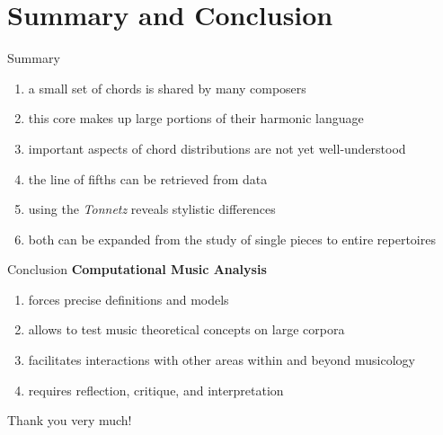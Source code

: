 \section{Summary and Conclusion}

\begin{frame}{Summary}
  \begin{enumerate}
  \item<+-> a small set of chords is shared by many composers
  \item<+-> this core makes up large portions of their harmonic language
  \item<+-> important aspects of chord distributions are not yet well-understood
  \item<+-> the line of fifths can be retrieved from data
  \item<+-> using the \emph{Tonnetz} reveals stylistic differences
  \item<+-> both can be expanded from the study of single pieces to entire repertoires
\end{enumerate}
\end{frame}

\begin{frame}{Conclusion}
  \textbf{Computational Music Analysis}
  \begin{enumerate}\pause
    \item<+-> forces precise definitions and models
    \item<+-> allows to test music theoretical concepts on large corpora
    \item<+-> facilitates interactions with other areas within and beyond musicology
    \item<+-> requires reflection, critique, and interpretation
  \end{enumerate}
\end{frame}



\begin{frame}[standout]
  Thank you very much!
\end{frame}
